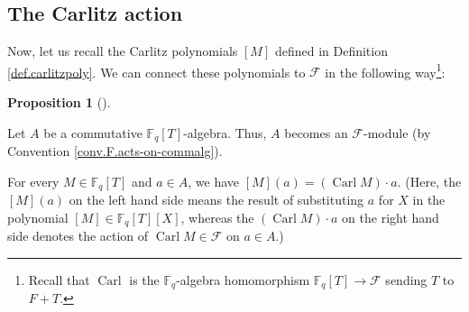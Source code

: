 \documentclass[numbers=enddot,12pt,final,onecolumn,notitlepage]{scrartcl}%
\theoremstyle{definition}
\newtheorem{prop}[theo]{Proposition}
\newenvironment{proposition}[1][]
{\begin{prop}[#1]\begin{leftbar}}
{\end{leftbar}\end{prop}}
\begin{document}
\subsection{The Carlitz action}

Now, let us recall the Carlitz polynomials $\left[  M\right]  $ defined in
Definition \ref{def.carlitzpoly}. We can connect these polynomials to
$\mathcal{F}$ in the following way\footnote{Recall that $\operatorname*{Carl}$
is the $\mathbb{F}_{q}$-algebra homomorphism $\mathbb{F}_{q}\left[  T\right]
\rightarrow\mathcal{F}$ sending $T$ to $F+T$.}:

\begin{proposition}
\label{prop.F.carlitz}Let $A$ be a commutative $\mathbb{F}_{q}\left[
T\right]  $-algebra. Thus, $A$ becomes an $\mathcal{F}$-module (by Convention
\ref{conv.F.acts-on-commalg}).

For every $M\in\mathbb{F}_{q}\left[  T\right]  $ and $a\in A$, we have
$\left[  M\right]  \left(  a\right)  =\left(  \operatorname*{Carl}M\right)
\cdot a$. (Here, the $\left[  M\right]  \left(  a\right)  $ on the left hand
side means the result of substituting $a$ for $X$ in the polynomial $\left[
M\right]  \in\mathbb{F}_{q}\left[  T\right]  \left[  X\right]  $, whereas the
$\left(  \operatorname*{Carl}M\right)  \cdot a$ on the right hand side denotes
the action of $\operatorname*{Carl}M\in\mathcal{F}$ on $a\in A$.)
\end{proposition}
\end{document}
